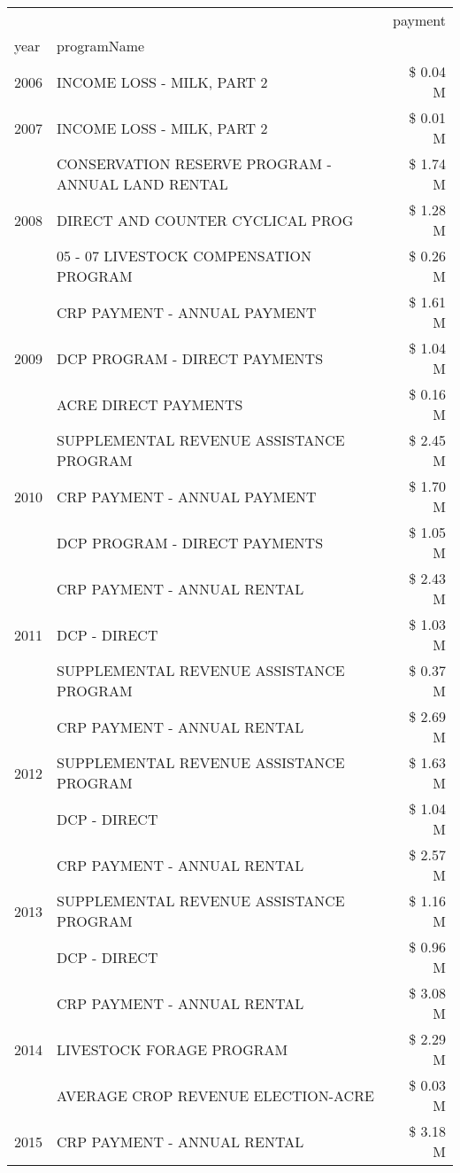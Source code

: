 \begin{tabular}{llr}
\toprule
 &  & payment \\
year & programName &  \\
\midrule
2006 & INCOME LOSS - MILK, PART 2 & \$ 0.04 M \\
\cline{1-3}
2007 & INCOME LOSS - MILK, PART 2 & \$ 0.01 M \\
\cline{1-3}
\multirow[t]{3}{*}{2008} & CONSERVATION RESERVE PROGRAM - ANNUAL LAND RENTAL & \$ 1.74 M \\
 & DIRECT AND COUNTER CYCLICAL PROG & \$ 1.28 M \\
 & 05 - 07 LIVESTOCK COMPENSATION PROGRAM & \$ 0.26 M \\
\cline{1-3}
\multirow[t]{3}{*}{2009} & CRP PAYMENT - ANNUAL PAYMENT & \$ 1.61 M \\
 & DCP PROGRAM - DIRECT PAYMENTS & \$ 1.04 M \\
 & ACRE DIRECT PAYMENTS & \$ 0.16 M \\
\cline{1-3}
\multirow[t]{3}{*}{2010} & SUPPLEMENTAL REVENUE ASSISTANCE PROGRAM & \$ 2.45 M \\
 & CRP PAYMENT - ANNUAL PAYMENT & \$ 1.70 M \\
 & DCP PROGRAM - DIRECT PAYMENTS & \$ 1.05 M \\
\cline{1-3}
\multirow[t]{3}{*}{2011} & CRP PAYMENT - ANNUAL RENTAL & \$ 2.43 M \\
 & DCP - DIRECT & \$ 1.03 M \\
 & SUPPLEMENTAL REVENUE ASSISTANCE PROGRAM & \$ 0.37 M \\
\cline{1-3}
\multirow[t]{3}{*}{2012} & CRP PAYMENT - ANNUAL RENTAL & \$ 2.69 M \\
 & SUPPLEMENTAL REVENUE ASSISTANCE PROGRAM & \$ 1.63 M \\
 & DCP - DIRECT & \$ 1.04 M \\
\cline{1-3}
\multirow[t]{3}{*}{2013} & CRP PAYMENT - ANNUAL RENTAL & \$ 2.57 M \\
 & SUPPLEMENTAL REVENUE ASSISTANCE PROGRAM & \$ 1.16 M \\
 & DCP - DIRECT & \$ 0.96 M \\
\cline{1-3}
\multirow[t]{3}{*}{2014} & CRP PAYMENT - ANNUAL RENTAL & \$ 3.08 M \\
 & LIVESTOCK FORAGE PROGRAM & \$ 2.29 M \\
 & AVERAGE CROP REVENUE ELECTION-ACRE & \$ 0.03 M \\
\cline{1-3}
\multirow[t]{2}{*}{2015} & CRP PAYMENT - ANNUAL RENTAL & \$ 3.18 M \\

\end{tabular}
